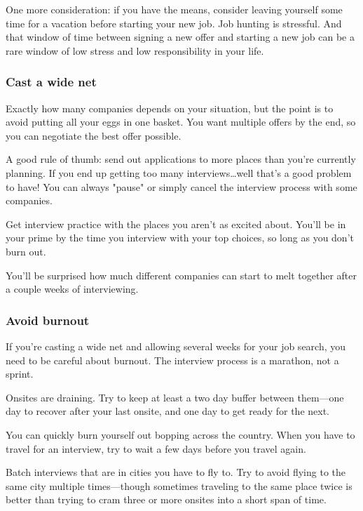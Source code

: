 \documentclass{article}
\begin{document}
One more consideration: if you have the means, consider leaving yourself some time for a vacation before starting your new job. Job hunting is stressful. And that window of time between signing a new offer and starting a new job can be a rare window of low stress and low responsibility in your life.



\subsubsection{Cast a wide net}

 Exactly how many companies depends on your situation, but the point is to avoid putting all your eggs in one basket. You want multiple offers by the end, so you can negotiate the best offer possible.

A good rule of thumb: send out applications to more places than you’re currently planning. If you end up getting too many interviews…well that’s a good problem to have! You can always "pause" or simply cancel the interview process with some companies.

 Get interview practice with the places you aren’t as excited about. You’ll be in your prime by the time you interview with your top choices, so long as you don’t burn out.

 You’ll be surprised how much different companies can start to melt together after a couple weeks of interviewing.


\subsubsection{Avoid burnout}

If you’re casting a wide net and allowing several weeks for your job search, you need to be careful about burnout. The interview process is a marathon, not a sprint.

 Onsites are draining. Try to keep at least a two day buffer between them—one day to recover after your last onsite, and one day to get ready for the next.

 You can quickly burn yourself out bopping across the country. When you have to travel for an interview, try to wait a few days before you travel again.

Batch interviews that are in cities you have to fly to. Try to avoid flying to the same city multiple times—though sometimes traveling to the same place twice is better than trying to cram three or more onsites into a short span of time.
\end{document}

